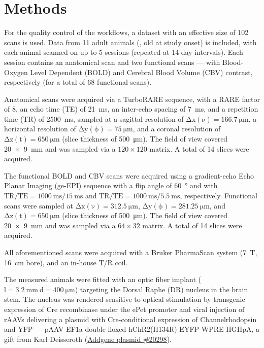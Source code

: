 \section{Methods}

For the quality control of the workflows, a dataset with an effective size of 102 scans is used.
Data from 11 adult animals
(,
old at study onset)
is included, with each animal scanned on up to 5 sessions (repeated at 14 day intervals).
Each session contains an anatomical scan and two functional scans --- with Blood-Oxygen Level Dependent (BOLD) \cite{Ogawa1990} and Cerebral Blood Volume (CBV) \cite{Marota1999} contrast, respectively (for a total of 68 functional scans).

Anatomical scans were acquired via a TurboRARE sequence, with a RARE factor of 8, an echo time (TE) of \SI{21}{\milli\second}, an inter-echo spacing of \SI{7}{\milli\second}, and a repetition time (TR) of \SI{2500}{\milli\second}, sampled at a sagittal resolution of $\mathrm{\Delta x(\nu)=\SI{166.7}{\micro\meter}}$, a horizontal resolution of $\mathrm{\Delta y(\phi)=\SI{75}{\micro\meter}}$, and a coronal resolution of $\mathrm{\Delta z(t)=\SI{650}{\micro\meter}}$ (slice thickness of \SI{500}{\micro\meter}).
The field of view covered \SI[product-units=power]{20 x 9}{\mm} and was sampled via a $\mathrm{120 \times 120}$ matrix.
A total of 14 slices were acquired.

The functional BOLD and CBV scans were acquired using a gradient-echo Echo Planar Imaging (ge-EPI) sequence with a flip angle of \SI{60}{\degree} and with $\mathrm{TR/TE = \SI{1000}{\milli\second}/\SI{15}{\milli\second}}$ and $\mathrm{TR/TE = \SI{1000}{\milli\second}/\SI{5.5}{\milli\second}}$, respectively.
Functional scans were sampled at $\mathrm{\Delta x(\nu)=\SI{312.5}{\micro\meter}}$, $\mathrm{\Delta y(\phi)=\SI{281.25}{\micro\meter}}$, and $\mathrm{\Delta z(t)=\SI{650}{\micro\meter}}$ (slice thickness of \SI{500}{\micro\meter}).
The field of view covered \SI[product-units=power]{20 x 9}{\mm} and was sampled via a $\mathrm{64 \times 32}$ matrix.
A total of 14 slices were acquired.

All aforementioned scans were acquired with a Bruker PharmaScan system (\SI{7}{\tesla}, \SI{16}{\centi\meter} bore), and an in-house T/R coil.

The measured animals were fitted with an optic fiber implant ($\mathrm{l=\SI{3.2}{\milli\meter} \ d=\SI{400}{\micro\meter}}$) targeting the Dorsal Raphe (DR) nucleus in the brain stem.
The nucleus was rendered sensitive to optical stimulation by transgenic expression of Cre recombinase under the ePet promoter \cite{Scott2005} and viral injection of rAAVs delivering a plasmid with Cre-conditional expression of Channelrhodopsin and YFP ---
pAAV-EF1a-double floxed-hChR2(H134R)-EYFP-WPRE-HGHpA, a gift from Karl Deisseroth (\href{https://www.addgene.org/20298/}{Addgene plasmid \#20298}).


